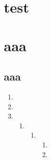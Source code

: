 \documentclass{ctexart}
\begin{document}
\chapter{test}
\chapter{aaa}
\section{aaa}
\begin{enumerate}
  \item
  \item
  \item
    \begin{enumerate}
      \item
        \begin{enumerate}
          \item
            \begin{enumerate}
              \item
              \item
            \end{enumerate}
        \end{enumerate}
    \end{enumerate}
\end{enumerate}
\end{document}
